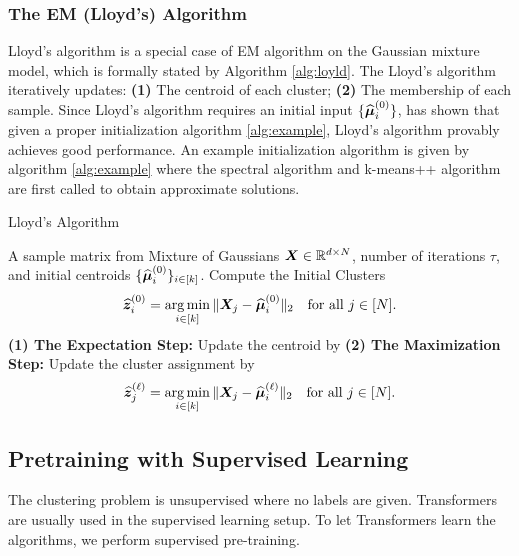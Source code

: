 \subsubsection{The EM (Lloyd's) Algorithm}
Lloyd's algorithm is a special case of EM algorithm on the Gaussian mixture model, which is formally stated by Algorithm \ref{alg:loyld}. The Lloyd's algorithm iteratively updates: \textbf{(1)} The centroid of each cluster; \textbf{(2)} The membership of each sample. Since Lloyd's algorithm requires an initial input $\{\widehat{\boldsymbol{\mu}}_i^{(0)}\}$, \citet{lu2016statistical} has shown that given a proper initialization algorithm \ref{alg:example}, Lloyd's algorithm provably achieves good performance. An example initialization algorithm is given by algorithm \ref{alg:example} where the spectral algorithm and k-means++ algorithm \citep{kumar2004simple} are first called to obtain approximate solutions.
\begin{algorithm}[h]
   \caption{Lloyd's Algorithm}
   \label{alg:loyld}
\begin{algorithmic}
    A sample matrix from Mixture of Gaussians $\boldsymbol{X}\in\mathbb{R}^{d\times N}$, number of iterations $\tau$, and initial centroids $\{\widehat{\boldsymbol{\mu}}^{(0)}_i\}_{i\in[k]}$.
   \STATE Compute the Initial Clusters 
   \begin{align}\label{z0}
       \widehat{\boldsymbol{z}}^{(0)}_i = \operatorname*{arg\,min}_{i\in[k]}\Vert \boldsymbol{X}_j - \widehat{\boldsymbol{\mu}}_i^{(0)}\Vert_2\quad\text{for all }j\in[N].
   \end{align}
   \STATE \textbf{(1) The Expectation Step:} Update the centroid by 
   \STATE \textbf{(2) The Maximization Step:} Update the cluster assignment by
   \begin{align*}
       \widehat{\boldsymbol{z}}^{(\ell)}_j=\operatorname*{arg\,min}_{i\in[k]}\Vert \boldsymbol{X}_j-\widehat{\boldsymbol{\mu}}_i^{(\ell)}\Vert_2\quad\text{for all }j\in[N].
   \end{align*}
   \ENDFOR
\end{algorithmic}
\end{algorithm}


\subsection{Pretraining with Supervised Learning}\label{pretrain}
The clustering problem is unsupervised where no labels are given. Transformers are usually used in the supervised learning setup. To let Transformers learn the algorithms, we perform supervised pre-training. 

